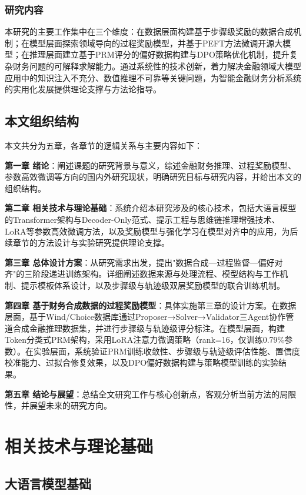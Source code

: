 \documentclass[professional,privacy,print,win,long,STEM,AutoFakeBold]{def/buaa}
\begin{document}
\subsection{研究内容}

本研究的主要工作集中在三个维度：在数据层面构建基于步骤级奖励的数据合成机制；在模型层面探索领域导向的过程奖励模型，并基于PEFT方法微调开源大模型；在推理层面建立基于PRM评分的偏好数据构建与DPO策略优化机制，提升复杂财务问题的可解释求解能力。通过系统性的技术创新，着力解决金融领域大模型应用中的知识注入不充分、数值推理不可靠等关键问题，为智能金融财务分析系统的实用化发展提供理论支撑与方法论指导。

\section{本文组织结构}

本文共分为五章，各章节的逻辑关系与主要内容如下：

\textbf{第一章 绪论}：阐述课题的研究背景与意义，综述金融财务推理、过程奖励模型、参数高效微调等方向的国内外研究现状，明确研究目标与研究内容，并给出本文的组织结构。

\textbf{第二章 相关技术与理论基础}：系统介绍本研究涉及的核心技术，包括大语言模型的Transformer架构与Decoder-Only范式、提示工程与思维链推理增强技术、LoRA等参数高效微调方法，以及奖励模型与强化学习在模型对齐中的应用，为后续章节的方法设计与实验研究提供理论支撑。

\textbf{第三章 总体设计方案}：从研究需求出发，提出"数据合成—过程监督—偏好对齐"的三阶段递进训练架构。详细阐述数据来源与处理流程、模型结构与工作机制、提示模板体系设计，以及步骤级与轨迹级双层奖励模型的联合训练机制。

\textbf{第四章 基于财务合成数据的过程奖励模型}：具体实施第三章的设计方案。在数据层面，基于Wind/Choice数据库通过Proposer→Solver→Validator三Agent协作管道合成金融推理数据集，并进行步骤级与轨迹级评分标注。在模型层面，构建Token分类式PRM架构，采用LoRA注意力微调策略（rank=16，仅训练0.79\%参数）。在实验层面，系统验证PRM训练收敛性、步骤级与轨迹级评估性能、置信度校准能力、过拟合修复效果，以及DPO偏好数据构建与策略模型训练的实验结果。

\textbf{第五章 结论与展望}：总结全文研究工作与核心创新点，客观分析当前方法的局限性，并展望未来的研究方向。

\newpage
\chapter{相关技术与理论基础}
\section{大语言模型基础}
\end{document}

